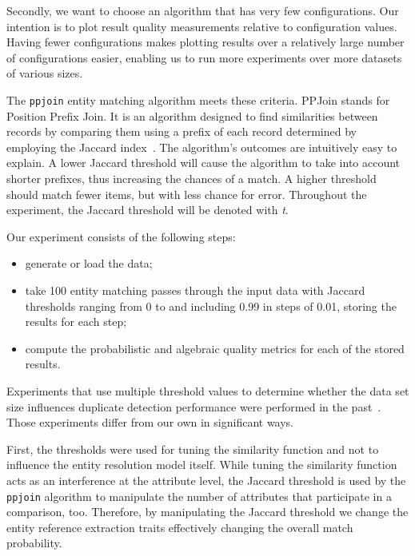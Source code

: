 Secondly, we want to choose an algorithm that has very few configurations.
Our intention is to plot result quality measurements relative to configuration
values.
Having fewer configurations makes plotting results over a relatively large
number of configurations easier, enabling us to run more experiments over more
datasets of various sizes.

The \texttt{ppjoin}\cite{ppjoin} entity matching algorithm meets these criteria.
PPJoin stands for Position Prefix Join.
It is an algorithm designed to find similarities between records by comparing
them using a prefix of each record determined by employing the Jaccard
index~\cite{jaccard1912,finley1996}.
The algorithm's outcomes are intuitively easy to explain.
A lower Jaccard threshold will cause the algorithm to take into account shorter
prefixes, thus increasing the chances of a match.
A higher threshold should match fewer items, but with less chance for error.
Throughout the experiment, the Jaccard threshold will be denoted with \textit{t}.


Our experiment consists of the following steps:

\begin{itemize}
    \item generate or load the data;
    \item take 100 entity matching passes through the input data with
          Jaccard thresholds ranging from 0 to and including 0.99 in steps of
          0.01, storing the results for each step;
    \item compute the probabilistic and algebraic quality metrics for each of
          the stored results.
\end{itemize}

Experiments that use multiple threshold values to determine whether the data
set size influences duplicate detection performance were performed in the
past~\cite{draisbach2013choosing}.
Those experiments differ from our own in significant ways.

First, the thresholds were used for tuning the similarity function and not to
influence the entity resolution model itself.
While tuning the similarity function acts as an interference at the attribute
level, the Jaccard threshold is used by the \texttt{ppjoin} algorithm
to manipulate the number of attributes that participate in a comparison, too.
Therefore, by manipulating the Jaccard threshold we change the entity reference
extraction traits effectively changing the overall match probability.

